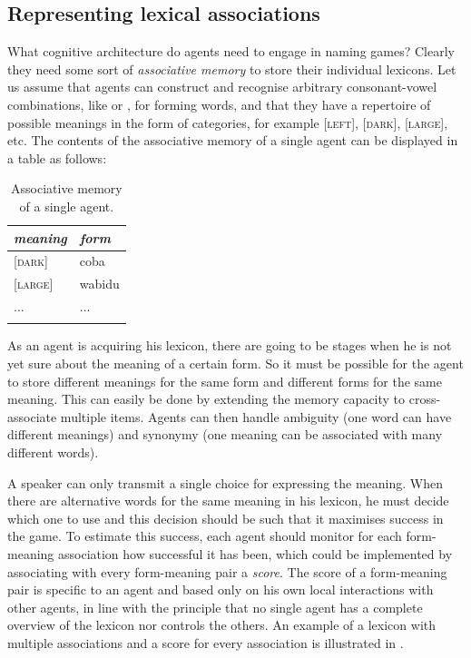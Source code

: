 \subsection{Representing lexical associations}

What cognitive architecture do agents need to engage in naming 
games? Clearly they need some sort of {\itshape associative memory} to
store their individual lexicons.
Let us assume that agents 
can construct and recognise arbitrary consonant-vowel combinations, 
like  or , for forming words, and that they 
have a repertoire of possible meanings in the form of 
categories, for example [\textsc{left}], [\textsc{dark}], [\textsc{large}], etc. 
The contents of the associative memory of a single agent can
be displayed in a table as follows: 

\begin{table}
\begin{center}
\begin{tabular}{ l  l }
\lsptoprule
{\itshape meaning} & {\itshape form} \\ 
\midrule{}
{}[\textsc{dark}] & coba \\ 
{}[\textsc{large}] & wabidu \\ 
... & ... \\ 
\lspbottomrule
\end{tabular}
\end{center}
\caption{\label{tab:t-mem}Associative memory of a single agent.}
\end{table}
As an agent is acquiring his lexicon, there are going to 
be stages when he is not yet sure about the meaning of 
a certain form. So it must be possible for the agent
to store different 
meanings for the same form and different forms for the
same meaning. This can easily be done by extending the memory capacity
to cross-associate multiple items. Agents can then 
handle ambiguity (one word can have different
meanings) and synonymy (one meaning can 
be associated with many different words). 

A speaker can only transmit a single choice for 
expressing the meaning.
When there are alternative words for the same meaning in 
his lexicon, he must decide which one to use and this decision
should be such that it maximises success in the game. 
To estimate this success, 
each agent should monitor for each form-meaning association
how successful it has been, which could be implemented 
by associating with every form-meaning pair 
a {\itshape score}. The score of a form-meaning pair
is specific to an agent and based only on his own 
local interactions with other agents, in line with the 
principle that no single agent has a complete overview of 
the lexicon nor controls the others. An example of 
a lexicon with multiple associations and a score for every 
association is illustrated in . 


